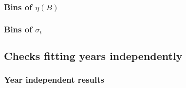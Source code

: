 \begin{frame} %
\frametitle{Bins of $\eta(B)$}

\tiny


\end{frame} %



\begin{frame} %
\frametitle{Bins of $\sigma_t$}

\tiny


\end{frame} %



\subsection{Checks fitting years independently} %



\begin{frame} %
\frametitle{Year independent results}

\tiny


\end{frame} %



